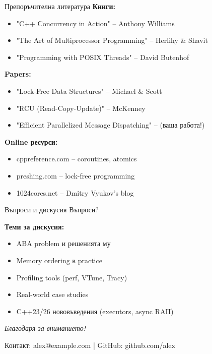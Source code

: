 \documentclass[aspectratio=169]{beamer}
\begin{document}
\begin{frame}{Препоръчителна литература}
\textbf{Книги:}
\begin{itemize}
    \item "C++ Concurrency in Action" – Anthony Williams
    \item "The Art of Multiprocessor Programming" – Herlihy \& Shavit
    \item "Programming with POSIX Threads" – David Butenhof
\end{itemize}

\vspace{0.3cm}

\textbf{Papers:}
\begin{itemize}
    \item "Lock-Free Data Structures" – Michael \& Scott
    \item "RCU (Read-Copy-Update)" – McKenney
    \item "Efficient Parallelized Message Dispatching" – (ваша работа!)
\end{itemize}

\vspace{0.3cm}

\textbf{Online ресурси:}
\begin{itemize}
    \item cppreference.com – coroutines, atomics
    \item preshing.com – lock-free programming
    \item 1024cores.net – Dmitry Vyukov's blog
\end{itemize}
\end{frame}

\begin{frame}{Въпроси и дискусия}
\centering
\Huge{Въпроси?}

\vspace{1cm}

\normalsize
\textbf{Теми за дискусия:}
\begin{itemize}
    \item ABA problem и решенията му
    \item Memory ordering в practice
    \item Profiling tools (perf, VTune, Tracy)
    \item Real-world case studies
    \item C++23/26 нововъведения (executors, async RAII)
\end{itemize}

\vspace{1cm}
\textit{Благодаря за вниманието!}

\vspace{0.5cm}
\small
Контакт: alex@example.com | GitHub: github.com/alex
\end{frame}
\end{document}
